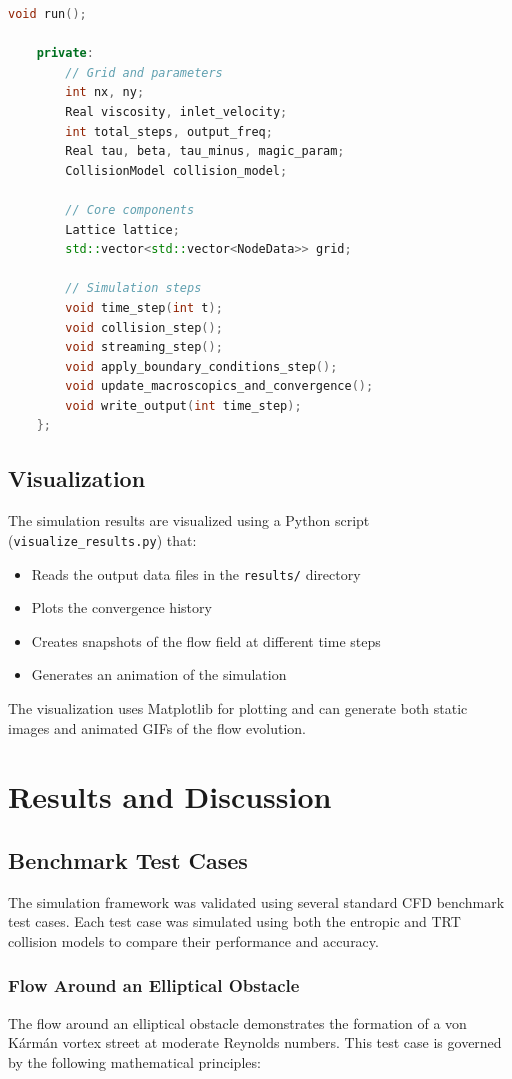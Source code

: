 \documentclass[12pt,a4paper]{article}
\begin{document}
\begin{itemize}
\begin{lstlisting}[language=C++]
        void run();

    private:
        // Grid and parameters
        int nx, ny;
        Real viscosity, inlet_velocity;
        int total_steps, output_freq;
        Real tau, beta, tau_minus, magic_param;
        CollisionModel collision_model;

        // Core components
        Lattice lattice;
        std::vector<std::vector<NodeData>> grid;

        // Simulation steps
        void time_step(int t);
        void collision_step();
        void streaming_step();
        void apply_boundary_conditions_step();
        void update_macroscopics_and_convergence();
        void write_output(int time_step);
    };
    \end{lstlisting}
\end{itemize}

\subsection{Visualization}
The simulation results are visualized using a Python script (\texttt{visualize\_results.py}) that:
\begin{itemize}
    \item Reads the output data files in the \texttt{results/} directory
    \item Plots the convergence history
    \item Creates snapshots of the flow field at different time steps
    \item Generates an animation of the simulation
\end{itemize}

The visualization uses Matplotlib for plotting and can generate both static images and animated GIFs of the flow evolution.

\section{Results and Discussion}

\subsection{Benchmark Test Cases}
The simulation framework was validated using several standard CFD benchmark test cases. Each test case was simulated using both the entropic and TRT collision models to compare their performance and accuracy.

\subsubsection{Flow Around an Elliptical Obstacle}
The flow around an elliptical obstacle demonstrates the formation of a von Kármán vortex street at moderate Reynolds numbers. This test case is governed by the following mathematical principles:
\end{document}
